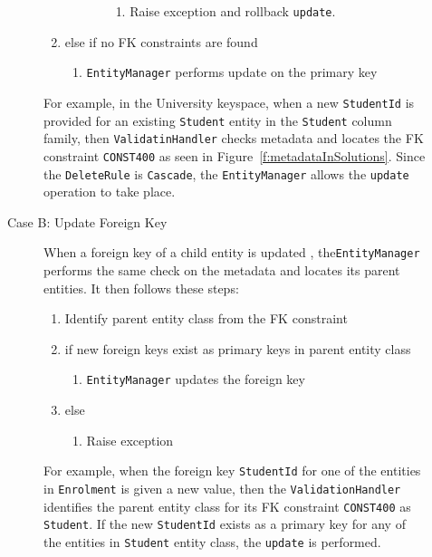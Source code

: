 \begin{description}
\begin{description}
\begin{enumerate}
\begin{enumerate}
\begin{enumerate}
\begin{enumerate}
				    	\item Raise exception and rollback \texttt{update}. 
				    	\end{enumerate}
				\end{enumerate}
			\end{enumerate}
		  \item else if no \ac{FK} constraints are found 
		  		\begin{enumerate}
		  		  \item \texttt{EntityManager}
		  performs update on the primary key
				\end{enumerate}
		 \end{enumerate}
		 
		For example,  in the University keyspace,  when a
		new \texttt{StudentId} is provided for an existing  \texttt{Student}
		entity in the \texttt{Student} column family,  then \texttt{ValidatinHandler}
		checks metadata and locates the \ac{FK} constraint \texttt{CONST400} as seen in
		Figure~\ref{f:metadataInSolutions}. Since the \texttt{DeleteRule} is
		\texttt{Cascade}, the \texttt{EntityManager} allows the \texttt{update}
		operation to take place.
		
		\item[Case B: Update Foreign Key] When a foreign key of a child entity is
		updated , the\newline  \texttt{EntityManager} performs the same check on the
		metadata and locates its parent entities. It then follows these steps:
		\begin{enumerate}
		  \item Identify parent entity class from the \ac{FK} constraint
		  \item if new foreign keys exist as primary keys in parent entity class
			\begin{enumerate}
				\item \texttt{EntityManager} updates  the foreign key
			\end{enumerate}
		  \item else 
			\begin{enumerate}
				\item Raise exception
			\end{enumerate}
		\end{enumerate}

		For example, when the foreign key \texttt{StudentId} for one of the entities
		in \texttt{Enrolment} is given a new value,  then the \texttt{ValidationHandler} 
		identifies the parent entity class for its \ac{FK} constraint
		\texttt{CONST400} as \texttt{Student}.  If the new \texttt{StudentId} 
		exists as a primary key for any
		 of the  entities in \texttt{Student} entity class,  the \texttt{update} is
		 performed.
		

\end{description}
\end{description}
